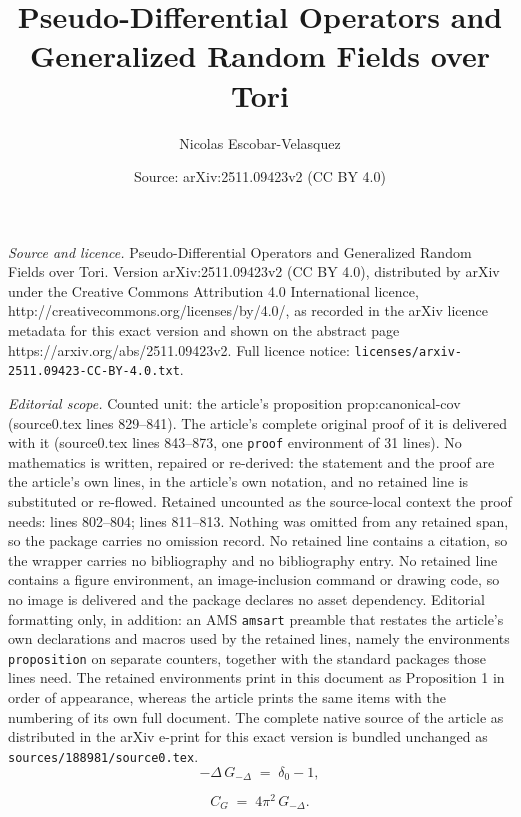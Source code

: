 \documentclass[10pt,a4paper]{amsart}
\title{Pseudo-Differential Operators and Generalized Random Fields over Tori}
\author{Nicolas Escobar-Velasquez}
\date{Source: arXiv:2511.09423v2 (CC BY 4.0)}
\begin{document}
\maketitle

\noindent\emph{Source and licence.} Pseudo-Differential Operators and Generalized Random Fields over Tori. Version arXiv:2511.09423v2 (CC BY 4.0), distributed by arXiv under the Creative Commons Attribution 4.0 International licence, http://creativecommons.org/licenses/by/4.0/, as recorded in the arXiv licence metadata for this exact version and shown on the abstract page https://arxiv.org/abs/2511.09423v2. Full licence notice: \texttt{licenses/arxiv-2511.09423-CC-BY-4.0.txt}.\par\smallskip

\noindent\textit{Editorial scope.} Counted unit: the article's proposition prop:canonical-cov (source0.tex lines 829--841). The article's complete original proof of it is delivered with it (source0.tex lines 843--873, one \texttt{proof} environment of 31 lines). No mathematics is written, repaired or re-derived: the statement and the proof are the article's own lines, in the article's own notation, and no retained line is substituted or re-flowed.  Retained uncounted as the source-local context the proof needs: lines 802--804; lines 811--813.  Nothing was omitted from any retained span, so the package carries no omission record.  No retained line contains a citation, so the wrapper carries no bibliography and no bibliography entry.  No retained line contains a figure environment, an image-inclusion command or drawing code, so no image is delivered and the package declares no asset dependency.  Editorial formatting only, in addition: an AMS \texttt{amsart} preamble that restates the article's own declarations and macros used by the retained lines, namely the environments \texttt{proposition} on separate counters, together with the standard packages those lines need.  The retained environments print in this document as Proposition 1 in order of appearance, whereas the article prints the same items with the numbering of its own full document.  The complete native source of the article as distributed in the arXiv e-print for this exact version is bundled unchanged as \texttt{sources/188981/source0.tex}.
\begin{equation}\label{eq:green}
    -\Delta\, G_{-\Delta} \;=\; \delta_0 - 1 ,
\end{equation}

    \begin{equation}\label{eq:canonical-green}
        C_G \;=\; 4\pi^2\, G_{-\Delta} .
    \end{equation}
\end{document}
